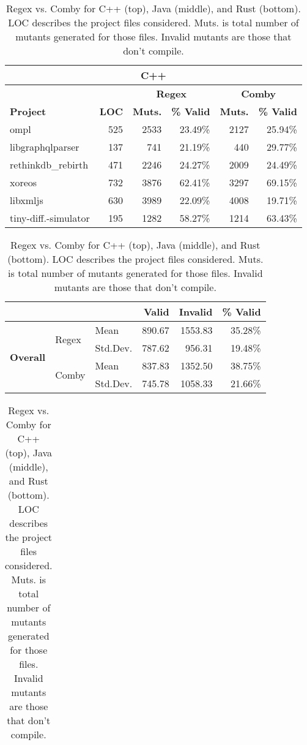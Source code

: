 \documentclass[sigconf,review, anonymous]{acmart}
\newcommand{\mc}[3]{\multicolumn{#1}{#2}{#3}}
\begin{document}
{%
\begin{table}[hbtp]
\centering
\caption{Regex vs. Comby for C++ (top), Java (middle), and Rust (bottom). LOC describes the project files considered. Muts. is total number of mutants generated for those files. Invalid mutants are those that don't compile.}
\label{tab:table_cpp1java}
\begin{tabularx}{\columnwidth}{X|r|rr|rr}
\bottomrule\toprule
\mc{6}{c}{\textbf{C++}} \\\midrule
                 &              & \multicolumn{2}{c|}{\textbf{Regex}} &\multicolumn{2}{c}{\textbf{Comby}}  \\
\textbf{Project} & \textbf{LOC} & \textbf{Muts.} & \textbf{\% Valid} & \textbf{Muts.} &  \textbf{\% Valid} \\\midrule
ompl & 525 & 2533 & 23.49\% &  2127  & 25.94\%   \\
libgraphqlparser& 137 & 741 & 21.19\%  & 440 & 29.77\% \\
rethinkdb\_rebirth &471 & 2246 & 24.27\% & 2009 & 24.49\% \\
xoreos & 732  & 3876  & 62.41\% & 3297 & 69.15\% \\
libxmljs &630 &  3989 & 22.09\% & 4008 & 19.71\% \\[0.5ex]
tiny-diff.-simulator &  195 & 1282 &58.27\% & 1214 & 63.43\% \\
\bottomrule
\end{tabularx}
\begin{tabularx}{\columnwidth}{Xllrrr}
                  & &       & \textbf{Valid}  & \textbf{Invalid}  & \textbf{\% Valid} \\\midrule
 \multirow{4}{*}{\textbf{Overall}} & \multirow{2}{*}{Regex} & Mean     & 890.67 &  1553.83 & 35.28\% \\
                          & & Std.Dev. & 787.62 & 956.31   & 19.48\%  \\\cline{2-6}
  & \multirow{2}{*}{Comby}  & Mean     & 837.83 & 1352.50 & 38.75\%  \\
                         & & Std.Dev. & 745.78 & 1058.33& 21.66\%  \\\bottomrule
 \end{tabularx}
\begin{tabularx}{\columnwidth}{X|r|cr|cr}

\end{tabularx}
\end{table}}
\end{document}
